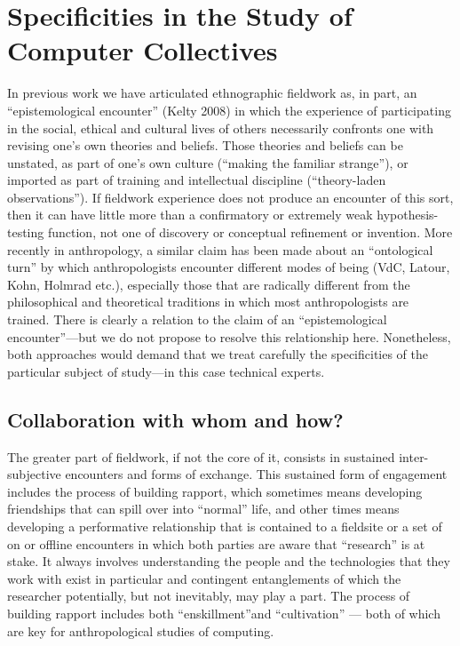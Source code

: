 \documentclass[10pt,letter,oneside]{scrartcl}
\begin{document}
\section{Specificities in the Study of Computer Collectives}

In previous work we have articulated ethnographic fieldwork as, in
part, an ``epistemological encounter'' (Kelty 2008) in which the
experience of participating in the social, ethical and cultural lives
of others necessarily confronts one with revising one's own theories
and beliefs.  Those theories and beliefs can be unstated, as part of
one's own culture (``making the familiar strange''), or imported as
part of training and intellectual discipline (``theory-laden
observations'').  If fieldwork experience does not produce an
encounter of this sort, then it can have little more than a
confirmatory or extremely weak hypothesis-testing function, not one of
discovery or conceptual refinement or invention.  More recently in
anthropology, a similar claim has been made about an ``ontological
turn'' by which anthropologists encounter different modes of being
(VdC, Latour, Kohn, Holmrad etc.), especially those that are radically
different from the philosophical and theoretical traditions in which
most anthropologists are trained.  There is clearly a relation to the
claim of an ``epistemological encounter''---but we do not propose to
resolve this relationship here.  Nonetheless, both approaches would
demand that we treat carefully the specificities of the particular
subject of study---in this case technical experts.


\subsection{Collaboration with whom and how?}

 The greater part of fieldwork, if not the core of it, consists in
 sustained inter-subjective encounters and forms of exchange.  This
 sustained form of engagement includes the process of building
 rapport, which sometimes means developing friendships that can spill
 over into ``normal'' life, and other times means developing a
 performative relationship that is contained to a fieldsite or a set
 of on or offline encounters in which both parties are aware that
 ``research'' is at stake. It always involves understanding the people
 and the technologies that they work with exist in particular and
 contingent entanglements of which the researcher potentially, but not
 inevitably, may play a part. The process of building rapport includes
 both ``enskillment''and ``cultivation'' --- both of which are key for
 anthropological studies of computing.   
\end{document}
